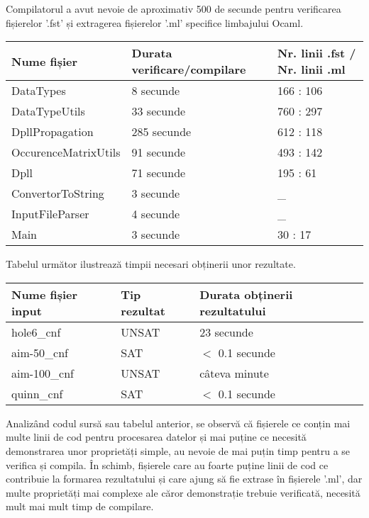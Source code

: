 Compilatorul a avut nevoie de aproximativ 500 de secunde pentru verificarea fișierelor '.fst' și extragerea fișierelor '.ml' specifice limbajului Ocaml. 
\newline
\begin{center}

\begin{tabular}{|l|l|l|} \hline
	Nume fișier & Durata verificare/compilare & Nr. linii .fst / Nr. linii .ml \\\hline
	DataTypes & 8 secunde & 166 : 106 \\\hline
	DataTypeUtils & 33 secunde & 760 : 297 \\\hline
	DpllPropagation & 285 secunde & 612 : 118 \\\hline
	OccurenceMatrixUtils & 91 secunde & 493 : 142 \\\hline
	Dpll & 71 secunde & 195 : 61 \\\hline
	ConvertorToString & 3 secunde & \_\\\hline
	InputFileParser & 4 secunde & \_ \\\hline
	Main & 3 secunde & 30 : 17 \\\hline	
\end{tabular}
\end{center}

Tabelul următor ilustrează timpii necesari obținerii unor rezultate.
\begin{center}
\begin{tabular}{|l|l|l|} \hline
	Nume fișier input & Tip rezultat & Durata obținerii rezultatului \\\hline
	hole6\_cnf & UNSAT & 23 secunde \\\hline
	aim-50\_cnf & SAT & $<$ 0.1 secunde \\\hline
	aim-100\_cnf & UNSAT & câteva minute \\\hline
	quinn\_cnf & SAT & $<$ 0.1 secunde \\\hline

\end{tabular}
\end{center}

Analizând codul sursă sau tabelul anterior, se observă că fișierele ce conțin mai multe linii de cod pentru procesarea datelor și mai puține ce necesită demonstrarea unor proprietăți simple, au nevoie de mai puțin timp pentru a se verifica și compila. În schimb, fișierele care au foarte puține linii de cod ce contribuie la formarea rezultatului și care ajung să fie extrase în fișierele '.ml', dar multe proprietăți mai complexe ale căror demonstrație trebuie verificată, necesită mult mai mult timp de compilare.
\newpage

